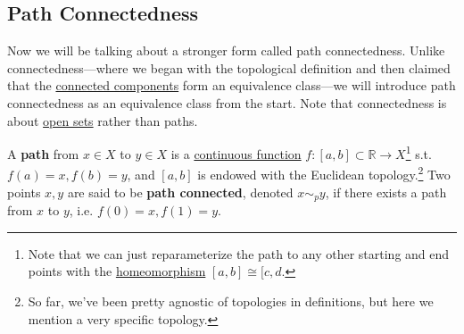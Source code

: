 \subsection{Path Connectedness} 

  Now we will be talking about a stronger form called path connectedness. Unlike connectedness---where we began with the topological definition and then claimed that the \hyperref[def:connected-components]{connected components} form an equivalence class---we will introduce path connectedness as an equivalence class from the start. Note that connectedness is about \hyperref[def:open-set]{open sets} rather than paths. 

  \begin{definition}[Path]
		\label{def:path}
    A \textbf{path} from $x \in X$ to $y \in X$ is a \hyperref[def:continuous_func]{continuous function} $f: [a, b] \subset \mathbb{R} \rightarrow X$\footnote{Note that we can just reparameterize the path to any other starting and end points with the \hyperref[def:homeomorphism]{homeomorphism} $[a, b] \cong [c, d$.} s.t. $f(a) = x, f(b) = y$, and $[a, b]$ is endowed with the Euclidean topology.\footnote{So far, we've been pretty agnostic of topologies in definitions, but here we mention a very specific topology.} Two points $x, y$ are said to be \textbf{path connected}, denoted $x \sim_p y$, if there exists a path from $x$ to $y$, i.e. $f(0) = x, f(1) = y$.
  \end{definition} 

